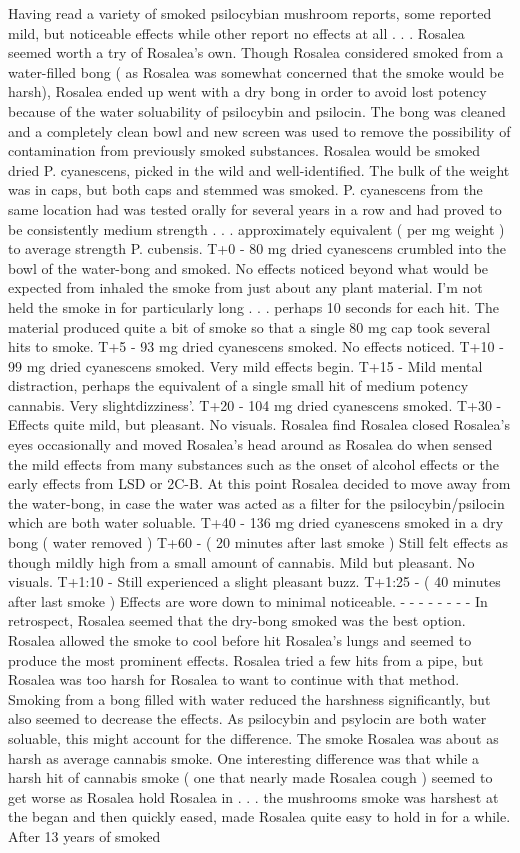 \documentclass[12pt]{book}
\begin{document}
Having read a variety of smoked psilocybian mushroom reports, some reported mild, but noticeable effects while other report no effects at all . . .  Rosalea seemed worth a try of Rosalea's own. Though Rosalea considered smoked from a water-filled bong ( as Rosalea was somewhat concerned that the smoke would be harsh), Rosalea ended up went with a dry bong in order to avoid lost potency because of the water soluability of psilocybin and psilocin. The bong was cleaned and a completely clean bowl and new screen was used to remove the possibility of contamination from previously smoked substances. Rosalea would be smoked dried P. cyanescens, picked in the wild and well-identified. The bulk of the weight was in caps, but both caps and stemmed was smoked. P. cyanescens from the same location had was tested orally for several years in a row and had proved to be consistently medium strength . . .  approximately equivalent ( per mg weight ) to average strength P. cubensis. T+0 - 80 mg dried cyanescens crumbled into the bowl of the water-bong and smoked. No effects noticed beyond what would be expected from inhaled the smoke from just about any plant material. I'm not held the smoke in for particularly long . . .  perhaps 10 seconds for each hit. The material produced quite a bit of smoke so that a single 80 mg cap took several hits to smoke. T+5 - 93 mg dried cyanescens smoked. No effects noticed. T+10 - 99 mg dried cyanescens smoked. Very mild effects begin. T+15 - Mild mental distraction, perhaps the equivalent of a single small hit of medium potency cannabis. Very slightdizziness'. T+20 - 104 mg dried cyanescens smoked. T+30 - Effects quite mild, but pleasant. No visuals. Rosalea find Rosalea closed Rosalea's eyes occasionally and moved Rosalea's head around as Rosalea do when sensed the mild effects from many substances such as the onset of alcohol effects or the early effects from LSD or 2C-B. At this point Rosalea decided to move away from the water-bong, in case the water was acted as a filter for the psilocybin/psilocin which are both water soluable. T+40 - 136 mg dried cyanescens smoked in a dry bong ( water removed ) T+60 - ( 20 minutes after last smoke ) Still felt effects as though mildly high from a small amount of cannabis. Mild but pleasant. No visuals. T+1:10 - Still experienced a slight pleasant buzz. T+1:25 - ( 40 minutes after last smoke ) Effects are wore down to minimal noticeable. - - - - - - - - In retrospect, Rosalea seemed that the dry-bong smoked was the best option. Rosalea allowed the smoke to cool before hit Rosalea's lungs and seemed to produce the most prominent effects. Rosalea tried a few hits from a pipe, but Rosalea was too harsh for Rosalea to want to continue with that method. Smoking from a bong filled with water reduced the harshness significantly, but also seemed to decrease the effects. As psilocybin and psylocin are both water soluable, this might account for the difference. The smoke Rosalea was about as harsh as average cannabis smoke. One interesting difference was that while a harsh hit of cannabis smoke ( one that nearly made Rosalea cough ) seemed to get worse as Rosalea hold Rosalea in . . .  the mushrooms smoke was harshest at the began and then quickly eased, made Rosalea quite easy to hold in for a while. After 13 years of smoked 
\end{document}
